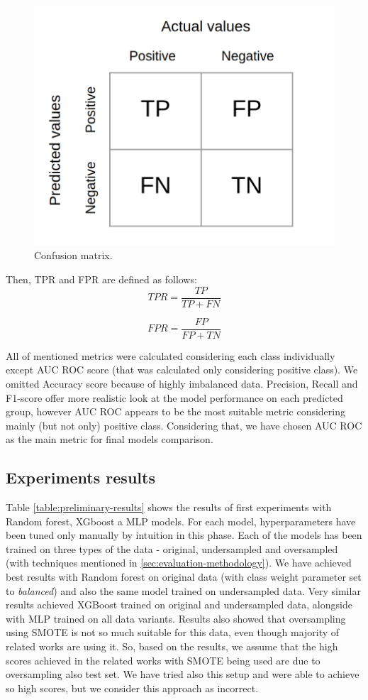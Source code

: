 \documentclass[runningheads]{llncs}
\begin{document}
\begin{figure}[h]
    \centering
    \includegraphics[width=0.5\linewidth]{figures/confusion_matrix.png}
    \caption{Confusion matrix.}
    \label{fig:confusion-matrix}
\end{figure}

\noindent Then, TPR and FPR are defined as follows:
$$TPR = \frac{TP}{TP + FN}$$

$$FPR = \frac{FP}{FP + TN}$$

All of mentioned metrics were calculated considering each class individually except AUC ROC score (that was calculated only considering positive class). We omitted Accuracy score because of highly imbalanced data. Precision, Recall and F1-score offer more realistic look at the model performance on each predicted group, however AUC ROC appears to be the most suitable metric considering mainly (but not only) positive class. Considering that, we have chosen AUC ROC as the main metric for final models comparison.

\subsection{Experiments results}
Table \ref{table:preliminary-results} shows the results of first experiments with Random forest, XGboost a MLP models. For each model, hyperparameters have been tuned only manually by intuition in this phase. Each of the models has been trained on three types of the data - original, undersampled and oversampled (with techniques mentioned in \ref{sec:evaluation-methodology}). We have achieved best results with Random forest on original data (with class weight parameter set to \textit{balanced}) and also the same model trained on undersampled data. Very similar results achieved XGBoost trained on original and undersampled data, alongside with MLP trained on all data variants. Results also showed that oversampling using SMOTE is not so much suitable for this data, even though majority of related works are using it. So, based on the results, we assume that the high scores achieved in the related works with SMOTE being used are due to oversampling also test set. We have tried also this setup and were able to achieve so high scores, but we consider this approach as incorrect.
\end{document}
